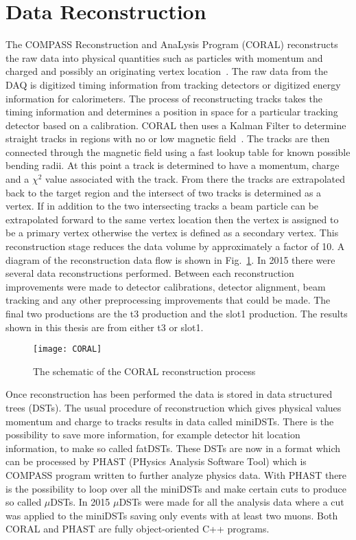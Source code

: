 \section{Data Reconstruction}
The COMPASS Reconstruction and AnaLysis Program (CORAL) reconstructs the raw
data into physical quantities such as particles with momentum and charged and
possibly an originating vertex location~\cite{CORAL}.  The raw data from the DAQ
is digitized timing information from tracking detectors or digitized energy
information for calorimeters.  The process of reconstructing tracks takes the
timing information and determines a position in space for a particular tracking
detector based on a calibration.  CORAL then uses a Kalman Filter to determine
straight tracks in regions with no or low magnetic field~\cite{KalmanFilter}.
The tracks are then connected through the magnetic field using a fast lookup
table for known possible bending radii.  At this point a track is determined to
have a momentum, charge and a $\chi^2$ value associated with the track.  From
there the tracks are extrapolated back to the target region and the intersect of
two tracks is determined as a vertex.  If in addition to the two intersecting
tracks a beam particle can be extrapolated forward to the same vertex location
then the vertex is assigned to be a primary vertex otherwise the vertex is
defined as a secondary vertex.  This reconstruction stage reduces the data
volume by approximately a factor of 10.  A diagram of the reconstruction data
flow is shown in Fig.~\ref{fig::CORAL}.  In 2015 there were several data
reconstructions performed.  Between each reconstruction improvements were made
to detector calibrations, detector alignment, beam tracking and any other
preprocessing improvements that could be made.  The final two productions are
the t3 production and the slot1 production.  The results shown in this thesis
are from either t3 or slot1.\par

\begin{figure}[h!t]
  \centering
  \texttt{[image: CORAL]}
  \caption{The schematic of the CORAL reconstruction process}
  \label{fig::CORAL}
\end{figure}

Once reconstruction has been performed the data is stored in data structured
trees (DSTs).  The usual procedure of reconstruction which gives physical values
momentum and charge to tracks results in data called miniDSTs.  There is the
possibility to save more information, for example detector hit location
information, to make so called fatDSTs.  These DSTs are now in a format which
can be processed by PHAST (PHysics Analysis Software Tool) which is COMPASS
program written to further analyze physics data.  With PHAST there is the
possibility to loop over all the miniDSTs and make certain cuts to produce so
called $\mu$DSTs.  In 2015 $\mu$DSTs were made for all the analysis data where a
cut was applied to the miniDSTs saving only events with at least two muons.
Both CORAL and PHAST are fully object-oriented C++ programs. \par

